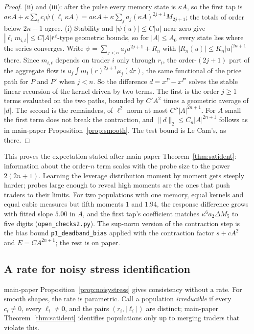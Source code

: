 \documentclass[12pt]{article}
\theoremstyle{definition}
\theoremstyle{remark}
\begin{document}
\begin{proof}
(ii) and (iii): after the pulse every memory state is $\kappa A$, so the first tap is $a\kappa A+\kappa\sum_ic_i\psi(\ell_i\kappa A)=a\kappa A+\kappa\sum_ja_j(\kappa A)^{2j+1}M_{2j+1}$; the totals of order below $2n+1$ agree. (i) Stability and $|\psi(u)|\le C|u|$ near zero give $|\ell_im_{i,t}|\le C|A|\bar r^{\,t}$-type geometric bounds, so for $|A|\le A_0$ every state lies where the series converges. Write $\psi=\sum_{j<n}a_ju^{2j+1}+R_n$ with $|R_n(u)|\le K_n|u|^{2n+1}$ there. Since $m_{i,t}$ depends on trader $i$ only through $r_i$, the order-$(2j+1)$ part of the aggregate flow is $a_j\int m_t(r)^{2j+1}\mu_j(dr)$, the same functional of the price path for $P$ and $P'$ when $j<n$. So the difference $d=x^P-x^{P'}$ solves the stable linear recursion of the kernel driven by two terms. The first is the order $j\ge1$ terms evaluated on the two paths, bounded by $C'A^2$ times a geometric average of $|d|$. The second is the remainders, of $\ell^2$ norm at most $C''|A|^{2n+1}$. For $A$ small the first term does not break the contraction, and $\|d\|_2\le C_n|A|^{2n+1}$ follows as in main-paper Proposition~\ref{prop:smooth}. The test bound is Le Cam's, as there.
\end{proof}

This proves the expectation stated after main-paper Theorem~\ref{thm:satident}: information about the order-$n$ term scales with the probe size to the power $2(2n+1)$. Learning the leverage distribution moment by moment gets steeply harder; probes large enough to reveal high moments are the ones that push traders to their limits. For two populations with one memory, equal kernels and equal cubic measures but fifth moments $1$ and $1.94$, the response difference grows with fitted slope $5.00$ in $A$, and the first tap's coefficient matches $\kappa^6a_2\Delta M_5$ to five digits (\nolinkurl{open_checks2.py}). The sup-norm version of the contraction step is the bias bound \texttt{p1\_deadband\_bias} applied with the contraction factor $s+cA^2$ and $E=CA^{2n+1}$; the rest is on paper.

\subsection{A rate for noisy stress identification}

main-paper Proposition~\ref{prop:noisystress} gives consistency without a rate. For smooth shapes, the rate is parametric. Call a population \emph{irreducible} if every $c_i\ne0$, every $\ell_i\ne0$, and the pairs $(r_i,|\ell_i|)$ are distinct; main-paper Theorem~\ref{thm:satident} identifies populations only up to merging traders that violate this.
\end{document}
